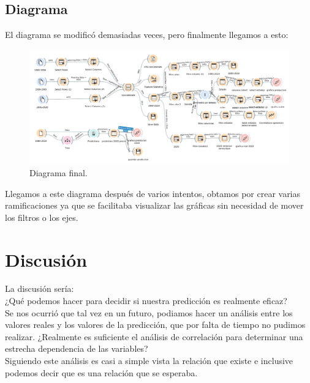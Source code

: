 \documentclass{article}
\begin{document}


\newpage
\subsection*{Diagrama}
El diagrama se modificó demasiadas veces, pero finalmente llegamos a esto:
\begin{figure}[htb!]
    \centering
    \includegraphics[width = 17 cm]{imagenes/diagrama.png}
    \caption{Diagrama final.}
    \label{diagrama}
\end{figure}

 Llegamos a este diagrama después de varios intentos, obtamos por crear varias ramificaciones ya que se facilitaba visualizar las gráficas sin necesidad de mover los filtros o los ejes.    
\newpage



\newpage

\section*{Discusión}
La discusión sería: \\ ¿Qué podemos hacer para decidir si nuestra predicción es realmente eficaz? \\
Se nos ocurrió que tal vez en un futuro, podiamos hacer un análisis entre los valores reales y los valores de la predicción, que por falta de tiempo no pudimos realizar.
¿Realmente es suficiente el análisis de correlación para determinar una estrecha dependencia de las variables? \\
Siguiendo este análisis es casi a simple vista la relación que existe e inclusive podemos decir que es una relación que se esperaba.



\newpage

\end{document}
